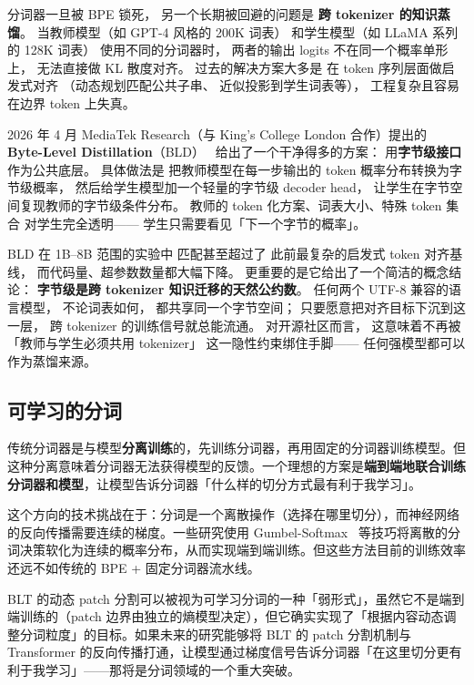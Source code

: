 分词器一旦被 BPE 锁死，
另一个长期被回避的问题是
\textbf{跨 tokenizer 的知识蒸馏}。
当教师模型（如 GPT-4 风格的 200K 词表）
和学生模型（如 LLaMA 系列的 128K 词表）
使用不同的分词器时，
两者的输出 logits 不在同一个概率单形上，
无法直接做 KL 散度对齐。
过去的解决方案大多是
在 token 序列层面做启发式对齐
（动态规划匹配公共子串、
近似投影到学生词表等），
工程复杂且容易在边界 token 上失真。

2026 年 4 月 MediaTek Research（与 King's College London 合作）提出的
\textbf{Byte-Level Distillation}（BLD）~\cite{liu2026bld}
给出了一个干净得多的方案：
用\textbf{字节级接口}作为公共底层。
具体做法是
把教师模型在每一步输出的
token 概率分布转换为字节级概率，
然后给学生模型加一个轻量的字节级 decoder head，
让学生在字节空间复现教师的字节级条件分布。
教师的 token 化方案、词表大小、特殊 token 集合
对学生完全透明——
学生只需要看见「下一个字节的概率」。

BLD 在 1B--8B 范围的实验中
匹配甚至超过了
此前最复杂的启发式 token 对齐基线，
而代码量、超参数数量都大幅下降。
更重要的是它给出了一个简洁的概念结论：
\textbf{字节级是跨 tokenizer 知识迁移的天然公约数}。
任何两个 UTF-8 兼容的语言模型，
不论词表如何，
都共享同一个字节空间；
只要愿意把对齐目标下沉到这一层，
跨 tokenizer 的训练信号就总能流通。
对开源社区而言，
这意味着不再被「教师与学生必须共用 tokenizer」
这一隐性约束绑住手脚——
任何强模型都可以作为蒸馏来源。

\subsection{可学习的分词}

传统分词器是与模型\textbf{分离训练}的，先训练分词器，再用固定的分词器训练模型。但这种分离意味着分词器无法获得模型的反馈。一个理想的方案是\textbf{端到端地联合训练分词器和模型}，让模型告诉分词器「什么样的切分方式最有利于我学习」。

这个方向的技术挑战在于：分词是一个离散操作（选择在哪里切分），而神经网络的反向传播需要连续的梯度。一些研究使用 Gumbel-Softmax~\cite{jang2017gumbel} 等技巧将离散的分词决策软化为连续的概率分布，从而实现端到端训练。但这些方法目前的训练效率还远不如传统的 BPE + 固定分词器流水线。

BLT 的动态 patch 分割可以被视为可学习分词的一种「弱形式」，虽然它不是端到端训练的（patch 边界由独立的熵模型决定），但它确实实现了「根据内容动态调整分词粒度」的目标。如果未来的研究能够将 BLT 的 patch 分割机制与 Transformer 的反向传播打通，让模型通过梯度信号告诉分词器「在这里切分更有利于我学习」——那将是分词领域的一个重大突破。

